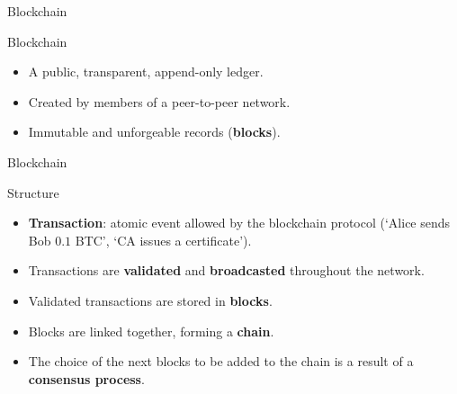 \begin{frame}{Blockchain}

\begin{exampleblock}{Blockchain}
\begin{itemize}
\item A public, transparent,
append-only ledger.
\item Created by members of a peer-to-peer
network.
\item Immutable and unforgeable records (\textbf{blocks}).
\end{itemize}
\end{exampleblock}

\end{frame}



\begin{frame}{Blockchain}

\begin{exampleblock}{Structure}
\begin{itemize}
\item \textbf{Transaction}: atomic event
allowed by the blockchain protocol (`Alice sends Bob $0.1$ BTC', `CA issues a certificate').
\item Transactions are \textbf{validated} and \textbf{broadcasted}
throughout the network.
\item Validated transactions are
stored in \textbf{blocks}.
\item Blocks are linked together,
forming a \textbf{chain}.
\item The choice of the next blocks to be
added to the chain is a result of a \textbf{consensus process}.
\end{itemize}
\end{exampleblock}

\end{frame}


